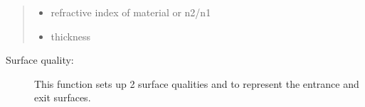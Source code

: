 \documentclass[letterpaper,10pt,english]{sphinxmanual}
\begin{document}
\begin{fulllineitems}
\begin{quote}
\begin{description}
\begin{itemize}
\item {} 
 \textendash{} refractive index of material or n2/n1

\item {} 
 \textendash{} thickness

\end{itemize}

\end{description}\end{quote}
\begin{description}
\item[{Surface quality:}] \leavevmode
This function sets up 2 surface qualities  and  to
represent the entrance and exit surfaces.

\end{description}

\end{fulllineitems}

\end{document}
